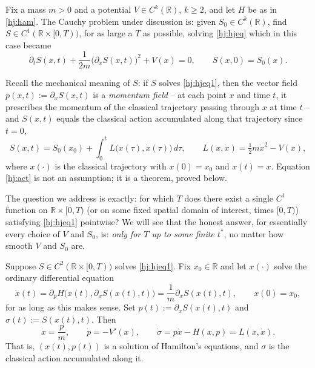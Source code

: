 Fix a mass $m>0$ and a potential $V\in C^k(\mathbb{R})$, $k\ge 2$, and let $H$
be as in \eqref{hj:ham}. The Cauchy problem under discussion is: given 
$S_0 \in C^k(\mathbb{R})$, 
find $S\in C^1(\mathbb{R}\times[0,T))$, for as large a $T$ as
possible, solving \eqref{hj:hjeq} which in this case became 
\begin{equation}
\partial_t S(x,t) + \frac{1}{2m}\big(\partial_x S(x,t)\big)^2 + V(x) = 0, \qquad S(x,0)=S_0(x).
\label{hj:hjeq1}
\end{equation}

Recall the mechanical meaning of $S$: if $S$ solves \eqref{hj:hjeq1}, then the
vector field $p(x,t):=\partial_xS(x,t)$ is a \emph{momentum field} -- at each
point $x$ and time $t$, it prescribes the momentum of the classical trajectory
passing through $x$ at time $t$ -- and $S(x,t)$ equals the classical action
accumulated along that trajectory since $t=0$,
\begin{equation}
S(x,t) = S_0(x_0) + \int_0^t L\big(x(\tau),\dot x(\tau)\big)\,d\tau, 
    \qquad L(x,\dot x)=\tfrac12 m\dot x^2 - V(x),
\label{hj:act}
\end{equation}
where $x(\cdot)$ is the classical trajectory with $x(0)=x_0$ and $x(t)=x$.
Equation \eqref{hj:act} is not an assumption; it is a theorem, proved 
 below.

The question we address is exactly: for which $T$ does there exist a single
$C^1$ function on $\mathbb{R}\times[0,T)$ (or on some fixed spatial domain of
interest, times $[0,T)$) satisfying \eqref{hj:hjeq1} pointwise? We will see that
the honest answer, for essentially every choice of $V$ and $S_0$, is:
\emph{only for $T$ up to some finite $t^\ast$}, no matter how smooth $V$ and
$S_0$ are.

\begin{proposition}
\label{prop:characteristics}
Suppose $S\in C^2(\mathbb{R}\times[0,T))$ solves \eqref{hj:hjeq1}. Fix
    $x_0\in\mathbb{R}$ and let $x(\cdot)$ solve the ordinary differential
    equation
\[
\dot x(t) = \partial_pH\big(x(t),\partial_xS(x(t),t)\big) =
    \frac{1}{m}\partial_xS(x(t),t), \qquad x(0)=x_0,
\]
for as long as this makes sense. Set $p(t):=\partial_xS(x(t),t)$ 
    and $\sigma(t):=S(x(t),t)$. Then
\begin{equation}
\dot x = \frac{p}{m}, \qquad \dot p = -V'(x), 
    \qquad \dot\sigma = p\dot x - H(x,p) = L(x,\dot x).
\label{hj:hameqs}
\end{equation}
That is, $(x(t),p(t))$ is a solution of Hamilton's equations, and $\sigma$ is
    the classical action accumulated along it.
\end{proposition}


